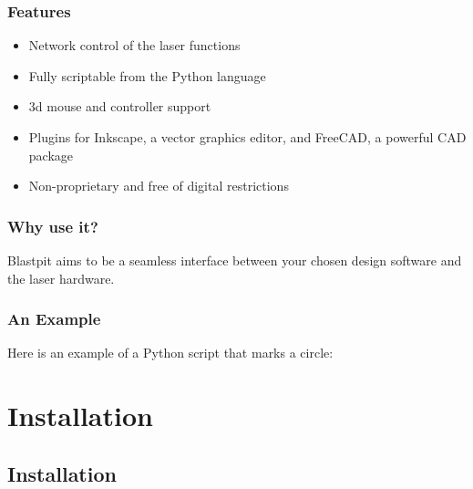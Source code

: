 \documentclass[12pt,fleqn]{book} %
\begin{document}
\section{Features}

\begin{itemize}
        \item Network control of the laser functions
        \item Fully scriptable from the Python language
        \item 3d mouse and controller support
        \item Plugins for Inkscape, a vector graphics editor, and FreeCAD, a powerful CAD package
        \item Non-proprietary and free of digital restrictions
\end{itemize}

\section{Why use it?}

Blastpit aims to be a seamless interface between your chosen design software
and the laser hardware.

\section{An Example}

Here is an example of a Python script that marks a circle:


%

\part{Installation}

\chapter{Installation}
\end{document}
